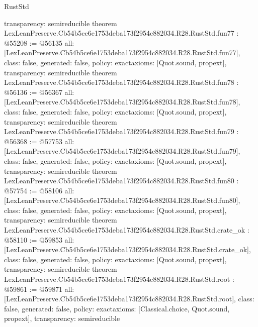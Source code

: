 \begin{lexlean}{RustStd}
\begin{coremodule}
{  transparency: semireducible
}
theorem LexLeanPreserve.Cb54b5ce6e1753deba173f2954c882034.R28.RustStd.fun77 : @55208 := @56135 {
  all: [LexLeanPreserve.Cb54b5ce6e1753deba173f2954c882034.R28.RustStd.fun77],
  class: false,
  generated: false,
  policy: exact{axioms: [Quot.sound, propext]},
  transparency: semireducible
}
theorem LexLeanPreserve.Cb54b5ce6e1753deba173f2954c882034.R28.RustStd.fun78 : @56136 := @56367 {
  all: [LexLeanPreserve.Cb54b5ce6e1753deba173f2954c882034.R28.RustStd.fun78],
  class: false,
  generated: false,
  policy: exact{axioms: [Quot.sound, propext]},
  transparency: semireducible
}
theorem LexLeanPreserve.Cb54b5ce6e1753deba173f2954c882034.R28.RustStd.fun79 : @56368 := @57753 {
  all: [LexLeanPreserve.Cb54b5ce6e1753deba173f2954c882034.R28.RustStd.fun79],
  class: false,
  generated: false,
  policy: exact{axioms: [Quot.sound, propext]},
  transparency: semireducible
}
theorem LexLeanPreserve.Cb54b5ce6e1753deba173f2954c882034.R28.RustStd.fun80 : @57754 := @58106 {
  all: [LexLeanPreserve.Cb54b5ce6e1753deba173f2954c882034.R28.RustStd.fun80],
  class: false,
  generated: false,
  policy: exact{axioms: [Quot.sound, propext]},
  transparency: semireducible
}
theorem LexLeanPreserve.Cb54b5ce6e1753deba173f2954c882034.R28.RustStd.crate_ok : @58110 := @59853 {
  all: [LexLeanPreserve.Cb54b5ce6e1753deba173f2954c882034.R28.RustStd.crate_ok],
  class: false,
  generated: false,
  policy: exact{axioms: [Quot.sound, propext]},
  transparency: semireducible
}
theorem LexLeanPreserve.Cb54b5ce6e1753deba173f2954c882034.R28.RustStd.root : @59861 := @59871 {
  all: [LexLeanPreserve.Cb54b5ce6e1753deba173f2954c882034.R28.RustStd.root],
  class: false,
  generated: false,
  policy: exact{axioms: [Classical.choice, Quot.sound, propext]},
  transparency: semireducible
}


\end{coremodule}
\end{lexlean}
